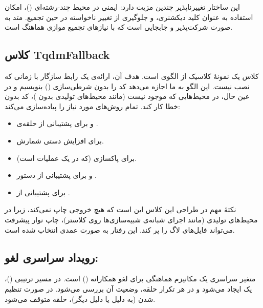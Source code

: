 این ساختار تغییرناپذیر چندین مزیت دارد: ایمنی در محیط چند-رشته‌ای ()، امکان استفاده به عنوان کلید دیکشنری، و جلوگیری از تغییر ناخواسته در حین تجمیع. متد  به صورت شرکت‌پذیر و جابجایی است که با نیازهای تجمیع موازی هماهنگ است.

\subsection{کلاس TqdmFallback}

کلاس  یک نمونۀ کلاسیک از الگوی  است. هدف آن، ارائه‌ی یک رابط سازگار با  زمانی که  نصب نیست. این الگو به ما اجازه می‌دهد کد را بدون شرطی‌سازی () بنویسیم و در عین حال، در محیط‌هایی که  موجود نیست (مانند محیط‌های تولیدی بدون )، کد بدون خطا کار کند.  تمام روش‌های مورد نیاز  را پیاده‌سازی می‌کند:

\begin{itemize}
	\item {} و  برای پشتیبانی از حلقه‌ی .
	\item {} برای افزایش دستی شمارش.
	\item {} برای پاکسازی (که در  یک عملیات  است).
	\item {} و  برای پشتیبانی از دستور .
	\item {} برای پشتیبانی از .
\end{itemize}

نکتۀ مهم در طراحی این کلاس این است که هیچ خروجی چاپ نمی‌کند، زیرا در محیط‌های تولیدی (مانند اجرای شبانه‌ی شبیه‌سازی‌ها روی کلاستر)، چاپ نوار پیشرفت می‌تواند فایل‌های لاگ را پر کند. این رفتار به صورت عمدی انتخاب شده است.

\subsection{رویداد سراسری لغو: }

متغیر سراسری  یک مکانیزم هماهنگی برای لغو همکارانه () است. در مسیر ترتیبی ()، یک  ایجاد می‌شود و در هر تکرار حلقه، وضعیت آن بررسی می‌شود. در صورت تنظیم شدن (به دلیل  یا دلیل دیگر)، حلقه متوقف می‌شود.

